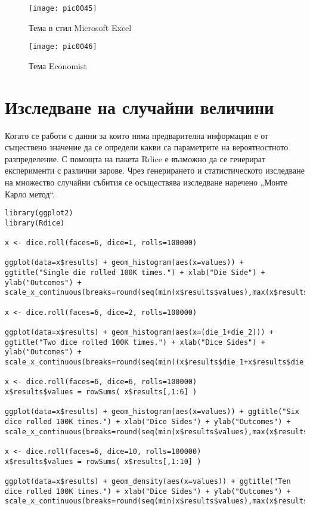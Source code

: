\begin{figure}[h!]
  \centering
  \texttt{[image: pic0045]}
  \caption{Тема в стил Microsoft Excel}
\label{figure0045}
\end{figure}
\FloatBarrier

\begin{figure}[h!]
  \centering
  \texttt{[image: pic0046]}
  \caption{Тема Economist}
\label{figure0046}
\end{figure}
\FloatBarrier

\section{Изследване на случайни величини}

Когато се работи с данни за които няма предварителна информация е от съществено значение да се определи какви са параметрите на вероятностното разпределение. С помощта на пакета Rdice е възможно да се генерират експерименти с различни зарове. Чрез генерирането и статистическото изследване на множество случайни събития се осъществява изследване наречено „Монте Карло метод“.

\begin{lstlisting}[caption=Случайни величини със зарове, label=listing0156]
library(ggplot2)
library(Rdice)

x <- dice.roll(faces=6, dice=1, rolls=100000)

ggplot(data=x$results) + geom_histogram(aes(x=values)) + ggtitle("Single die rolled 100K times.") + xlab("Die Side") + ylab("Outcomes") + scale_x_continuous(breaks=round(seq(min(x$results$values),max(x$results$values),by=0.5)))

x <- dice.roll(faces=6, dice=2, rolls=100000)

ggplot(data=x$results) + geom_histogram(aes(x=(die_1+die_2))) + ggtitle("Two dice rolled 100K times.") + xlab("Dice Sides") + ylab("Outcomes") + scale_x_continuous(breaks=round(seq(min((x$results$die_1+x$results$die_2)),max((x$results$die_1+x$results$die_2)),by=0.5)))

x <- dice.roll(faces=6, dice=6, rolls=100000)
x$results$values = rowSums( x$results[,1:6] )

ggplot(data=x$results) + geom_histogram(aes(x=values)) + ggtitle("Six dice rolled 100K times.") + xlab("Dice Sides") + ylab("Outcomes") + scale_x_continuous(breaks=round(seq(min(x$results$values),max(x$results$values),by=0.5)))

x <- dice.roll(faces=6, dice=10, rolls=100000)
x$results$values = rowSums( x$results[,1:10] )

ggplot(data=x$results) + geom_density(aes(x=values)) + ggtitle("Ten dice rolled 100K times.") + xlab("Dice Sides") + ylab("Outcomes") + scale_x_continuous(breaks=round(seq(min(x$results$values),max(x$results$values),by=0.5)))
\end{lstlisting}

